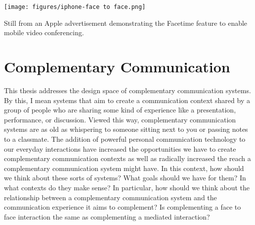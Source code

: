



\begin{marginfigure}
	\texttt{[image: figures/iphone-face to face.png]}
	\caption{Still from an Apple advertisement demonstrating the Facetime feature to enable mobile video conferencing.}
	\label{fig:facetime}
\end{marginfigure}




\section{Complementary Communication}
This thesis addresses the design space of complementary communication systems. By this, I mean systems that aim to create a communication context shared by a group of people who are sharing some kind of experience like a presentation, performance, or discussion. Viewed this way, complementary communication systems are as old as whispering to someone sitting next to you or passing notes to a classmate. The addition of powerful personal communication technology to our everyday interactions have increased the opportunities we have to create complementary communication contexts as well as radically increased the reach a complementary communication system might have. In this context, how should we think about these sorts of systems? What goals should we have for them? In what contexts do they make sense? In particular, how should we think about the relationship between a complementary communication system and the communication experience it aims to complement? Is complementing a face to face interaction the same as complementing a mediated interaction?

